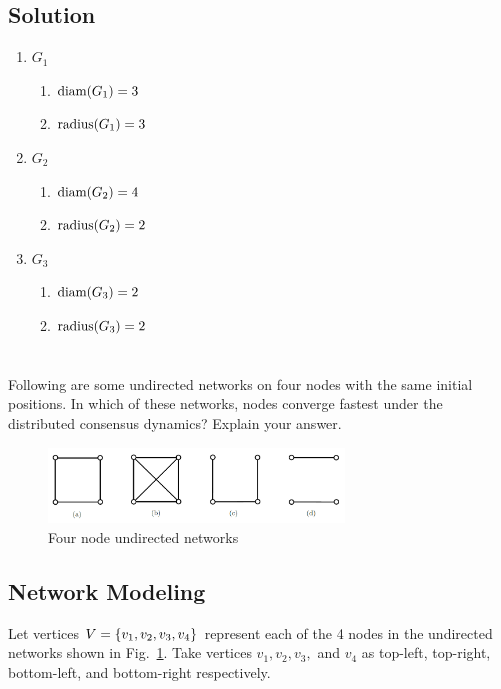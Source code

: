\documentclass[]{article}
\numberwithin{equation}{section}
\renewcommand{\figurename}{Fig.}
\newcommand{\diam}{\textnormal{diam}}
\newcommand{\radius}{\textnormal{radius}}
\begin{document}
\subsection{Solution}
\begin{enumerate}
	\item $G_1$
	\begin{enumerate}
		\item $\diam(G_1) = 3$
		\item $\radius(G_1) = 3$
	\end{enumerate}
	\item $G_2$
	\begin{enumerate}
		\item $\diam(G_2) = 4$
		\item $\radius(G_2) = 2$
	\end{enumerate}
	\item $G_3$
	\begin{enumerate}
		\item $\diam(G_3) = 2$
		\item $\radius(G_3) = 2$
	\end{enumerate}
\end{enumerate}

\newpage
\section{}
Following are some undirected networks on four nodes with the same initial positions.
In which of these networks, nodes converge fastest under the distributed consensus dynamics? 
Explain your answer.

\begin{figure}[h]
	\centering
	\includegraphics[width=0.7\textwidth]{figs/pblm7.png}
	\caption{Four node undirected networks}
	\label{fig:pblm7}
\end{figure}

\subsection{Network Modeling}
Let vertices $V = \qty{v_1, v_2, v_3, v_4}$ represent each of the 4 nodes in the undirected networks shown in \figurename \ \ref{fig:pblm7}.
Take vertices $v_1, v_2, v_3,$ and $v_4$ as top-left, top-right, bottom-left, and bottom-right respectively.
\end{document}
